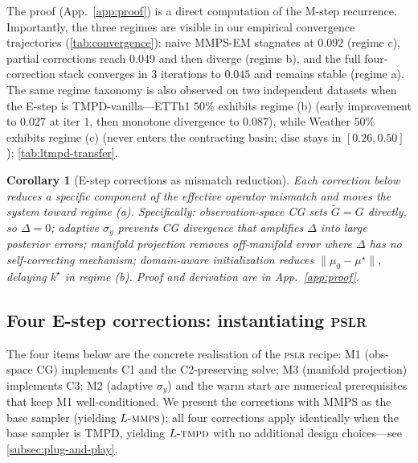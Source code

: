 \documentclass{article}
\theoremstyle{plain}
\newtheorem{corollary}[theorem]{Corollary}
\theoremstyle{definition}
\theoremstyle{remark}
\newcommand{\pslr}{\textsc{pslr}}
\newcommand{\lmmps}{L\mbox{-}\textsc{mmps}}
\newcommand{\ltmpd}{L\mbox{-}\textsc{tmpd}}
\begin{document}
The proof (App.~\ref{app:proof}) is a direct computation of the M-step recurrence. Importantly, the three regimes are visible in our empirical convergence trajectories (\cref{tab:convergence}): naive MMPS-EM stagnates at $0.092$ (regime c), partial corrections reach $0.049$ and then diverge (regime b), and the full four-correction stack converges in $3$ iterations to $0.045$ and remains stable (regime a). The same regime taxonomy is also observed on two independent datasets when the E-step is TMPD-vanilla---ETTh1 $50\%$ exhibits regime (b) (early improvement to $0.027$ at iter $1$, then monotone divergence to $0.087$), while Weather $50\%$ exhibits regime (c) (never enters the contracting basin; disc stays in $[0.26, 0.50]$); \cref{tab:ltmpd-transfer}.

\begin{corollary}[E-step corrections as mismatch reduction]
\label{cor:corrections}
Each correction below reduces a specific component of the effective operator mismatch and moves the system toward regime (a). Specifically: observation-space CG sets $\tilde{G} = G$ directly, so $\Delta = 0$; adaptive $\sigma_y$ prevents CG divergence that amplifies $\Delta$ into large posterior errors; manifold projection removes off-manifold error where $\Delta$ has no self-correcting mechanism; domain-aware initialization reduces $\|\mu_0 - \mu^\star\|$, delaying $k^\star$ in regime (b). Proof and derivation are in App.~\ref{app:proof}.
\end{corollary}

\vspace{-1mm}
\subsection{Four E-step corrections: instantiating \pslr{}}
\label{subsec:corrections}
\vspace{-1mm}

The four items below are the concrete realisation of the \pslr{} recipe: M1 (obs-space CG) implements C1 and the C2-preserving solve; M3 (manifold projection) implements C3; M2 (adaptive $\sigma_y$) and the warm start are numerical prerequisites that keep M1 well-conditioned. We present the corrections with MMPS as the base sampler (yielding $\lmmps$); all four corrections apply identically when the base sampler is TMPD, yielding $\ltmpd$ with no additional design choices---see \cref{subsec:plug-and-play}.
\end{document}
